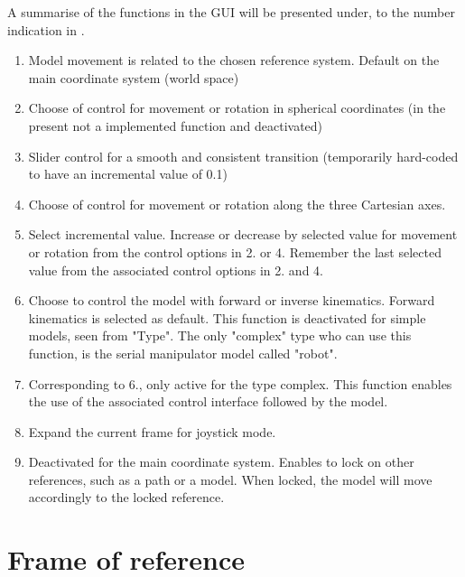 A summarise of the functions in the GUI will be presented under, to the number indication in .
\begin{enumerate}
\item Model movement is related to the chosen reference system. Default on the main coordinate system (world space)
\item Choose of control for movement or rotation in spherical coordinates (in the present not a implemented function and deactivated)

\item Slider control for a smooth and consistent transition (temporarily hard-coded to have an incremental value of 0.1)

\item Choose of control for movement or rotation along the three Cartesian axes.

\item Select incremental value. Increase or decrease by selected value for movement or rotation from the control options in 2. or 4. Remember the last selected value from the associated control options in 2. and 4.

\item Choose to control the model with forward or inverse kinematics. Forward kinematics is selected as default. This function is deactivated for simple models, seen from "Type". The only "complex" type who can use this function, is the serial manipulator model called "robot".

\item Corresponding to 6., only active for the type complex. This function enables the use of the associated control interface followed by the model.

\item Expand the current frame for joystick mode.

\item Deactivated for the main coordinate system. Enables to lock on other references, such as a path or a model. When locked, the model will move accordingly to the locked reference.
\end{enumerate}


\section{Frame of reference}

